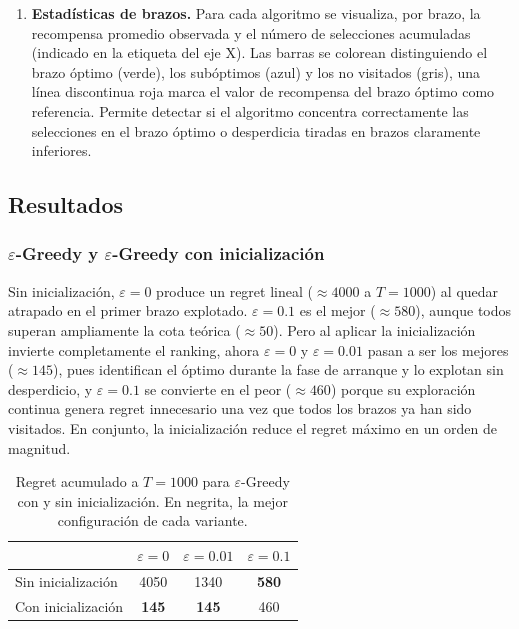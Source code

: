 \begin{enumerate}
    \item \textbf{Estadísticas de brazos.} Para cada algoritmo se visualiza, por brazo, la recompensa promedio observada y el número de selecciones acumuladas (indicado en la etiqueta del eje X). Las barras se colorean distinguiendo el brazo óptimo (verde), los subóptimos (azul) y los no visitados (gris), una línea discontinua roja marca el valor de recompensa del brazo óptimo como referencia. Permite detectar si el algoritmo concentra correctamente las selecciones en el brazo óptimo o desperdicia tiradas en brazos claramente inferiores.

\end{enumerate}

\subsection*{Resultados}

\subsubsection*{$\varepsilon$-Greedy y $\varepsilon$-Greedy con inicialización}

Sin inicialización, $\varepsilon{=}0$ produce un regret lineal (${\approx}4000$ a $T{=}1000$) al quedar atrapado en el primer brazo explotado. $\varepsilon{=}0{.}1$ es el mejor (${\approx}580$), aunque todos superan ampliamente la cota teórica (${\approx}50$). Pero al aplicar la inicialización invierte completamente el ranking, ahora $\varepsilon{=}0$ y $\varepsilon{=}0{.}01$ pasan a ser los mejores (${\approx}145$), pues identifican el óptimo durante la fase de arranque y lo explotan sin desperdicio, y $\varepsilon{=}0{.}1$ se convierte en el peor (${\approx}460$) porque su exploración continua genera regret innecesario una vez que todos los brazos ya han sido visitados. En conjunto, la inicialización reduce el regret máximo en un orden de magnitud.

\begin{table}[h]
    \centering
    \small
    \begin{tabular}{lccc}
        \toprule
        & $\varepsilon{=}0$ & $\varepsilon{=}0{.}01$ & $\varepsilon{=}0{.}1$ \\
        \midrule
        Sin inicialización & 4050 & 1340 & \textbf{580} \\
        Con inicialización & \textbf{145} & \textbf{145} & 460 \\
        \bottomrule
    \end{tabular}
    \caption{Regret acumulado a $T{=}1000$ para $\varepsilon$-Greedy con y sin
    inicialización. En negrita, la mejor configuración de cada variante.}
    \label{tab:greedy_init}
\end{table}

